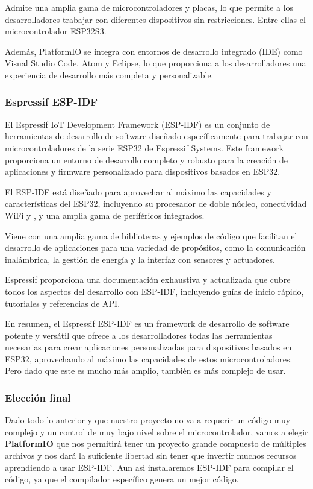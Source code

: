 Admite una amplia gama de microcontroladores y placas, lo que permite a los desarrolladores trabajar con diferentes dispositivos sin restricciones. Entre ellas el microcontrolador ESP32S3.

Además, PlatformIO se integra con entornos de desarrollo integrado (IDE) como Visual Studio Code, Atom y Eclipse, lo que proporciona a los desarrolladores una experiencia de desarrollo más completa y personalizable.

\subsubsection{Espressif ESP-IDF}
El Espressif IoT Development Framework (ESP-IDF) es un conjunto de herramientas de desarrollo de software diseñado específicamente para trabajar con microcontroladores de la serie ESP32 de Espressif Systems. Este framework proporciona un entorno de desarrollo completo y robusto para la creación de aplicaciones y firmware personalizado para dispositivos basados en ESP32.

El ESP-IDF está diseñado para aprovechar al máximo las capacidades y características del ESP32, incluyendo su procesador de doble núcleo, conectividad \gls{WiFi} y , y una amplia gama de periféricos integrados.

Viene con una amplia gama de bibliotecas y ejemplos de código que facilitan el desarrollo de aplicaciones para una variedad de propósitos, como la comunicación inalámbrica, la gestión de energía y la interfaz con sensores y actuadores.

Espressif proporciona una documentación exhaustiva y actualizada que cubre todos los aspectos del desarrollo con ESP-IDF, incluyendo guías de inicio rápido, tutoriales y referencias de \gls{API}.

En resumen, el Espressif ESP-IDF es un framework de desarrollo de software potente y versátil que ofrece a los desarrolladores todas las herramientas necesarias para crear aplicaciones personalizadas para dispositivos basados en ESP32, aprovechando al máximo las capacidades de estos microcontroladores. Pero dado que este es mucho más amplio, también es más complejo de usar.

\subsubsection{Elección final}

Dado todo lo anterior y que nuestro proyecto no va a requerir un código muy complejo y un control de muy bajo nivel sobre el microcontrolador, vamos a elegir \textbf{PlatformIO} que nos permitirá tener un proyecto grande compuesto de múltiples archivos y nos dará la suficiente libertad sin tener que invertir muchos recursos aprendiendo a usar ESP-IDF. Aun asi instalaremos ESP-IDF para compilar el código, ya que el compilador específico genera un mejor código.
\newpage
